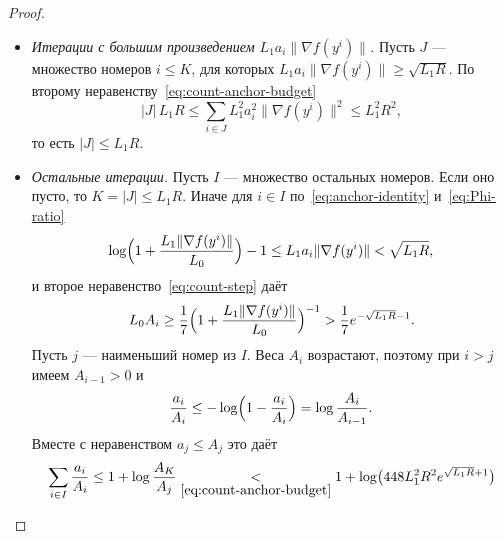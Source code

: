 \documentclass[11pt,a4paper]{article}
\newcommand{\norm}[1]{\|#1\|}
\newcommand{\by}[2]{\mathrel{\underset{#2}{#1}}}
\begin{document}
\begin{proof}
\begin{itemize}
\begin{equation}
\begin{aligned}
 \frac{L_1\Phi(\norm{\nabla f(y^i)})}{\norm{\nabla f(y^i)}}
 &=\Bigl(1+\frac{L_0}{L_1\norm{\nabla f(y^i)}}\Bigr)\log\Bigl(1+\frac{L_1\norm{\nabla f(y^i)}}{L_0}\Bigr)-1\\
 &\ge\log\Bigl(1+\frac{L_1\norm{\nabla f(y^i)}}{L_0}\Bigr)-1 .
\end{aligned}
\end{equation}
Умножив~\eqref{eq:anchor-identity} на $7a_i/A_i$ и сложив с первым неравенством~\eqref{eq:count-step}, получаем
\begin{equation}\label{eq:count-two-groups}
\begin{aligned}
 \MoveEqLeft2\sqrt7\Bigl(\sqrt{L_0A_i}-\sqrt{L_0A_{i-1}}\Bigr)+\Bigl(\frac{7L_1a_i^2\norm{\nabla f(y^i)}}{A_i}\Bigr)^{2/3}\\
 &\ge\Bigl(\frac{L_0}{L_0+L_1\norm{\nabla f(y^i)}}\Bigr)^{1/2}+\Bigl(\frac{L_1\norm{\nabla f(y^i)}}{L_0+L_1\norm{\nabla f(y^i)}}\Bigr)^{2/3}\\
 &\by{\ge}{(\mathrm б)}\frac{L_0}{L_0+L_1\norm{\nabla f(y^i)}}+\frac{L_1\norm{\nabla f(y^i)}}{L_0+L_1\norm{\nabla f(y^i)}}=1 .
\end{aligned}
\end{equation}
Здесь (б) --- неравенства $t^{1/2}\ge t$ и $t^{2/3}\ge t$ при $0\le t\le1$.
\item \emph{Итерации с большим произведением $L_1a_i\norm{\nabla f(y^i)}$.} Пусть $J$ --- множество номеров $i\le K$, для которых $L_1a_i\norm{\nabla f(y^i)}\ge\sqrt{L_1R}$. По второму неравенству~\eqref{eq:count-anchor-budget}
\[
 |J|\,L_1R\le\sum_{i\in J}L_1^2a_i^2\norm{\nabla f(y^i)}^2\le L_1^2R^2 ,
\]
то есть $|J|\le L_1R$.
\item \emph{Остальные итерации.} Пусть $I$ --- множество остальных номеров. Если оно пусто, то $K=|J|\le L_1R$. Иначе для $i\in I$ по~\eqref{eq:anchor-identity} и~\eqref{eq:Phi-ratio}
\[
 \log\Bigl(1+\frac{L_1\norm{\nabla f(y^i)}}{L_0}\Bigr)-1\le L_1a_i\norm{\nabla f(y^i)}<\sqrt{L_1R} ,
\]
и второе неравенство~\eqref{eq:count-step} даёт
\[
 L_0A_i\ge\frac17\Bigl(1+\frac{L_1\norm{\nabla f(y^i)}}{L_0}\Bigr)^{-1}>\frac17e^{-\sqrt{L_1R}-1} .
\]
Пусть $j$ --- наименьший номер из $I$. Веса $A_i$ возрастают, поэтому при $i>j$ имеем $A_{i-1}>0$ и
\[
 \frac{a_i}{A_i}\le-\log\Bigl(1-\frac{a_i}{A_i}\Bigr)=\log\frac{A_i}{A_{i-1}} .
\]
Вместе с неравенством $a_j\le A_j$ это даёт
\begin{align*}
 \sum_{i\in I}\frac{a_i}{A_i}
 &\le1+\log\frac{A_K}{A_j}
 \by{<}{\eqref{eq:count-anchor-budget}}1+\log\bigl(448L_1^2R^2e^{\sqrt{L_1R}+1}\bigr)\\

\end{align*}
\end{itemize}
\end{proof}
\end{document}
